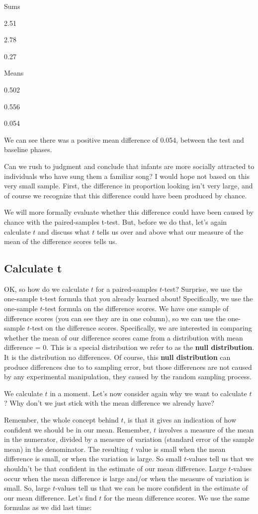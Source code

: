\documentclass[]{book}
\begin{document}
Sums

2.51

2.78

0.27

Means

0.502

0.556

0.054

We can see there was a positive mean difference of 0.054, between the test and baseline phases.

Can we rush to judgment and conclude that infants are more socially attracted to individuals who have sung them a familiar song? I would hope not based on this very small sample. First, the difference in proportion looking isn't very large, and of course we recognize that this difference could have been produced by chance.

We will more formally evaluate whether this difference could have been caused by chance with the paired-samples t-test. But, before we do that, let's again calculate \(t\) and discuss what \(t\) tells us over and above what our measure of the mean of the difference scores tells us.

\hypertarget{calculate-t}{%
\subsection{Calculate t}\label{calculate-t}}

OK, so how do we calculate \(t\) for a paired-samples \(t\)-test? Surprise, we use the one-sample t-test formula that you already learned about! Specifically, we use the one-sample \(t\)-test formula on the difference scores. We have one sample of difference scores (you can see they are in one column), so we can use the one-sample \(t\)-test on the difference scores. Specifically, we are interested in comparing whether the mean of our difference scores came from a distribution with mean difference = 0. This is a special distribution we refer to as the \textbf{null distribution}. It is the distribution no differences. Of course, this \textbf{null distribution} can produce differences due to to sampling error, but those differences are not caused by any experimental manipulation, they caused by the random sampling process.

We calculate \(t\) in a moment. Let's now consider again why we want to calculate \(t\)? Why don't we just stick with the mean difference we already have?

Remember, the whole concept behind \(t\), is that it gives an indication of how confident we should be in our mean. Remember, \(t\) involves a measure of the mean in the numerator, divided by a measure of variation (standard error of the sample mean) in the denominator. The resulting \(t\) value is small when the mean difference is small, or when the variation is large. So small \(t\)-values tell us that we shouldn't be that confident in the estimate of our mean difference. Large \(t\)-values occur when the mean difference is large and/or when the measure of variation is small. So, large \(t\)-values tell us that we can be more confident in the estimate of our mean difference. Let's find \(t\) for the mean difference scores. We use the same formulas as we did last time:
\end{document}

